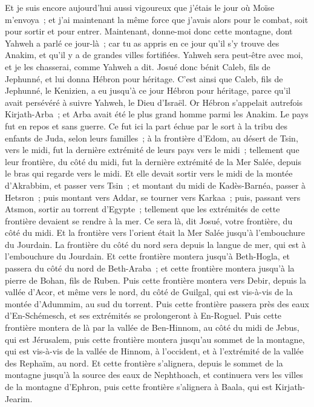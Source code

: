\begin{multicols}{2}
Et je suis encore aujourd'hui aussi vigoureux que j'étais le jour où Moïse m'envoya~; et j'ai maintenant la même force que j'avais alors pour le combat, soit pour sortir et pour entrer.
Maintenant, donne-moi donc cette montagne, dont Yahweh a parlé ce jour-là~; car tu as appris en ce jour qu'il s'y trouve des Anakim, et qu'il y a de grandes villes fortifiées. Yahweh sera peut-être avec moi, et je les chasserai, comme Yahweh a dit.
Josué donc bénit Caleb, fils de Jephunné, et lui donna Hébron pour héritage.
C'est ainsi que Caleb, fils de Jephunné, le Kenizien, a eu jusqu'à ce jour Hébron pour héritage, parce qu'il avait persévéré à suivre Yahweh, le Dieu d'Israël.
Or Hébron s'appelait autrefois Kirjath-Arba~; et Arba avait été le plus grand homme parmi les Anakim. Le pays fut en repos et sans guerre.
\VerseOne{} Ce fut ici la part échue par le sort à la tribu des enfants de Juda, selon leurs familles~; à la frontière d'Edom, au désert de Tsin, vers le midi, fut la dernière extrémité de leurs pays vers le midi~;
tellement que leur frontière, du côté du midi, fut la dernière extrémité de la Mer Salée, depuis le bras qui regarde vers le midi.
Et elle devait sortir vers le midi de la montée d'Akrabbim, et passer vers Tsin~; et montant du midi de Kadès-Barnéa, passer à Hetsron~; puis montant vers Addar, se tourner vers Karkaa~;
puis, passant vers Atsmon, sortir au torrent d'Egypte~; tellement que les extrémités de cette frontière devaient se rendre à la mer. Ce sera là, dit Josué, votre frontière, du côté du midi.
Et la frontière vers l'orient était la Mer Salée jusqu'à l'embouchure du Jourdain. La frontière du côté du nord sera depuis la langue de mer, qui est à l'embouchure du Jourdain.
Et cette frontière montera jusqu'à Beth-Hogla, et passera du côté du nord de Beth-Araba~; et cette frontière montera jusqu'à la pierre de Bohan, fils de Ruben.
Puis cette frontière montera vers Debir, depuis la vallée d'Acor, et même vers le nord, du côté de Guilgal, qui est vis-à-vis de la montée d'Adummim, au sud du torrent. Puis cette frontière passera près des eaux d'En-Schémesch, et ses extrémités se prolongeront à En-Roguel.
Puis cette frontière montera de là par la vallée de Ben-Hinnom, au côté du midi de Jebus, qui est Jérusalem, puis cette frontière montera jusqu'au sommet de la montagne, qui est vis-à-vis de la vallée de Hinnom, à l'occident, et à l'extrémité de la vallée des Rephaïm, au nord.
Et cette frontière s'alignera, depuis le sommet de la montagne jusqu'à la source des eaux de Nephthoach, et continuera vers les villes de la montagne d'Ephron, puis cette frontière s'alignera à Baala, qui est Kirjath-Jearim.

\end{multicols}
